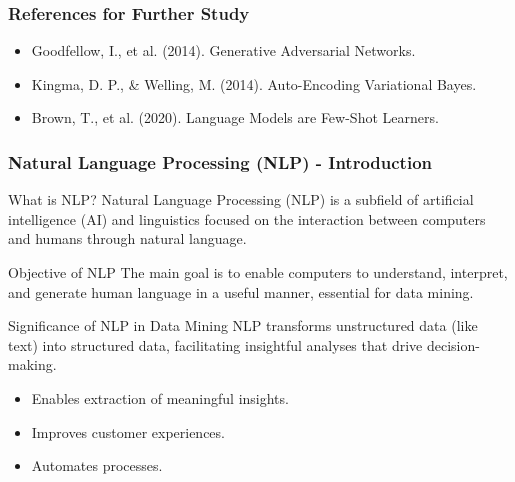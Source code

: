 \documentclass[aspectratio=169]{beamer}
\begin{document}
\begin{frame}[fragile]
    \frametitle{References for Further Study}
    \begin{itemize}
        \item Goodfellow, I., et al. (2014). Generative Adversarial Networks.
        \item Kingma, D. P., \& Welling, M. (2014). Auto-Encoding Variational Bayes.
        \item Brown, T., et al. (2020). Language Models are Few-Shot Learners.
    \end{itemize}
\end{frame}

\begin{frame}[fragile]
    \frametitle{Natural Language Processing (NLP) - Introduction}
    \begin{block}{What is NLP?}
        Natural Language Processing (NLP) is a subfield of artificial intelligence (AI) and linguistics focused on the interaction between computers and humans through natural language.
    \end{block}
    \begin{block}{Objective of NLP}
        The main goal is to enable computers to understand, interpret, and generate human language in a useful manner, essential for data mining.
    \end{block}
    \begin{block}{Significance of NLP in Data Mining}
        NLP transforms unstructured data (like text) into structured data, facilitating insightful analyses that drive decision-making.
    \end{block}
    \begin{itemize}
        \item Enables extraction of meaningful insights.
        \item Improves customer experiences.
        \item Automates processes.
    \end{itemize}
\end{frame}
\end{document}
